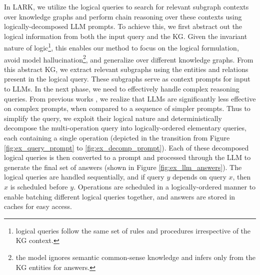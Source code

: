 \documentclass{article} %
\newcommand{\model}{LARK}
\begin{document}
In {\model}, we utilize the logical queries to search for relevant subgraph contexts over knowledge graphs and perform chain reasoning over these contexts using logically-decomposed LLM prompts. To achieve this, we first abstract out the logical information from both the input query and the KG. Given the invariant nature of logic\footnote{logical queries follow the same set of rules and procedures irrespective of the KG context.}, this enables our method to focus on the logical formulation, {avoid model hallucination\footnote{the model ignores semantic common-sense knowledge and infers only from the KG entities for answers.},} and generalize over different knowledge graphs. From this abstract KG, we extract relevant subgraphs using the entities and relations present in the logical query. These subgraphs serve as context prompts for input to LLMs.
In the next phase, we need to effectively handle complex reasoning queries. From previous works \citep{zhou2023leasttomost, khot2023decomposed}, we realize that LLMs are significantly less effective on complex prompts, when compared to a sequence of simpler prompts. Thus to simplify the query, we exploit their logical nature and deterministically decompose the multi-operation query into logically-ordered elementary queries, each containing a single operation (depicted in the transition from Figure \ref{fig:ex_query_prompt} to \ref{fig:ex_decomp_prompt}).
Each of these decomposed logical queries is then converted to a prompt and processed through the LLM to generate the final set of answers (shown in Figure \ref{fig:ex_llm_answers}). The logical queries are handled sequentially, and if query $y$ depends on query $x$, then $x$ is scheduled before $y$. Operations are scheduled in a logically-ordered manner to enable batching different logical queries together, and answers are stored in caches for easy access.
\end{document}
